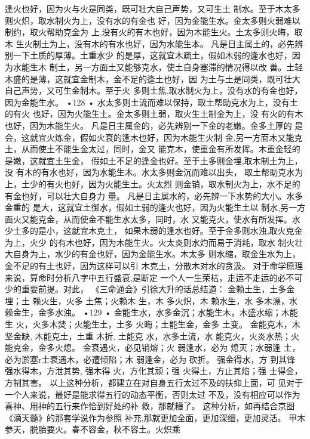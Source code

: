 逢火也好，因为火与火是同类，既可壮大自己声势，又可生土
制水。至于木太多则火炽，取水制火为上，没有水的有金也
好，因为金能生水。金太多则火弱难以制约，取火帮助克金为
上,没有火的有木也好，因为木能生火。土太多则火晦，取木
生火制土为上，没有木的有水也好，因为水能生本。
凡是日主属土的，必先辨别一下土质的厚薄。土重水少
的是厚，这就宜木疏土，假如木弱的逢水也好，因为水能生木
制土，另一方面土又能够克水，使土自身塞滞的情况得以改
善。土轻木盛的是薄，这就宜金制木，金不足的逢土也好，因
为土与土是同类，既可壮大自己声势，又可生金制木。至于火
多则土焦,取水制火为上，没有水的有金也好，因为金能生水。
•128 •
水太多则土流而难以保持，取土帮助克水为上，没有土的有火
也好，因为火能生土。金太多则土弱，取火生土制金为上，没
有火的有木也好，因为木能生火。
凡是日主属金的，必先辨别一下金的老嫩。金多土厚的
是会，这就宜火炼金，假如火衰的逢木也好，因为木能生火制
金,另一方面木又能克土，从而使土不能生金太过，同时，金又
能克木，使重金有所发挥。木重金轻的是嫩，这就宜土生金，
假如土不足的逢金也好。至于土多则金埋,取木制土为上，没
有木的有水也好，因为水能生木。水太多则金沉而难以出头，
取土帮助克水为上，土少的有火也好，因为火能生土。火太烈
则金销，取水制火为上，水不足的有金也好，可以壮大自身力
量。
凡是日主属水的，必先辨一下水势的大小。水多金重的
是大，这就宜土御水，假如土弱的逢火也好，因为火能生土以
制水,另一方面火又能克金，从而使金不能生水太多，同时，水
又能克火，使水有所发挥。水少土多的是小，这就宜木克土，
如果木弱的逢水也好。至于金多则水浊,取火克金为上，火少
的有木也好，因为木能生火。火太炎则水灼而易于消耗，取水
制火壮大自身为上，水少的有金也好，因为金能生水。木太多
则水缩，取金生水为上，金不足的有土也好，因为这样可以引
木克土，分散木对水的贪汲。
对于命学原理来说，算命时分析八字中五行盛衰,是断定
一个人一生荣枯，走运不走运的必不可少的重要前提。对此，
《三命通会》引徐大升的话总结道：
金赖土生，土多金埋；土 赖火生，火多 土焦；火赖木
生，木 多火炽，木 赖水生，水 多木漂，水 赖金生，金多水浊。
•129 •
金能生水，水多金沉；水能生木，木盛水缩；木能生
火，火多木焚；火能生土，土多 火晦；土能生金，金多 土变。
金能克木，木坚金缺, 木能克土，土重 木折, 土能克
水，水多土流，水 能克火，火炎水热；火能克金，金多火熄。
金衰遇火，必见销熔；火 弱逢水，必为 熄灭；水弱逢
土，必为淤塞r土衰遇木，必遭倾陷；木 弱逢金，必为 砍折。
强金得水，方 到其锋 强水得木，方泄其势, 强木得
火，方化其顽；强 火得土，方止其焰；强 士得金，方制其害。
以上这种分析，都建立在对自身五行太过不及的扶抑上面，可
见对于一个人来说，最好是能求得五行的动态平衡，否则太过
不及，没有相应可以作为喜神、用神的五行来作恰到好处的补
救，那就糟了。
这种分析，如再结合京图《滴天髓》的那套学说作为参照
补充,那就更加全面，更加深细，更加灵活。
甲木参天，脱胎要火。春不容金，秋不容土。火炽乘
